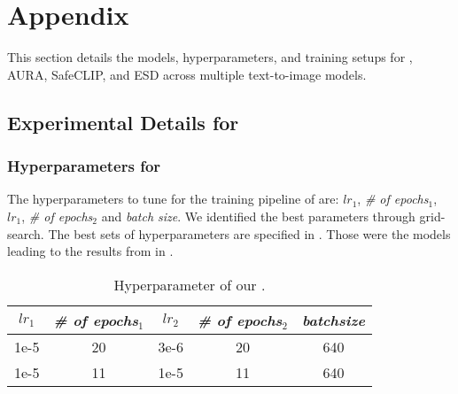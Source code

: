 \section{Appendix}
This section details the models, hyperparameters, and training setups for \ours, AURA, SafeCLIP, and ESD across multiple text-to-image models.

\subsection{Experimental Details for \ours}
\label{app:setup}

\subsubsection{Hyperparameters for \ours}
The hyperparameters to tune for the training pipeline of \ours are: \textit{$lr_1$}, \textit{\# of epochs$_1$}, \textit{$lr_1$}, \textit{\# of epochs$_2$} and \textit{batch size}. We identified the best parameters through grid-search. The best sets of hyperparameters are specified in . Those were the models leading to the results from \ours in .

\begin{table}[H]
    \centering
    \begin{tabular}{ccccc}
    \toprule
         \textit{$lr_1$} & \textit{\# of epochs$_1$} & \textit{$lr_2$} & \textit{\# of epochs$_2$} & \textit{batchsize}  \\
         \midrule
          1e-5 & 20 & 3e-6 & 20 & 640 \\
          1e-5 & 11 & 1e-5 & 11 & 640 \\
          \bottomrule
    \end{tabular}
    \caption{Hyperparameter of our \ours.}
    \label{tab:ours_parameters}
\end{table}

